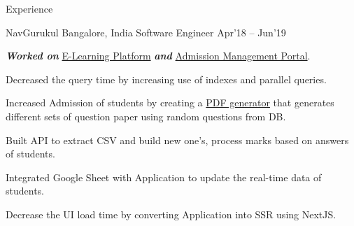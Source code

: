 \documentclass{resume} %
\begin{document}
\begin{rSection}{Experience}
  \begin{rWorkSection}{\Large NavGurukul}
                     {Bangalore, India}
                     {Software Engineer}
                     {Apr'18 -- Jun'19} {
    {\it\bf Worked on} \href{https://saral.navgurukul.org/}{E-Learning Platform} {\it\bf and} \href{http://admissions.navgurukul.org/}{Admission Management Portal}. 
    \item Decreased the query time by increasing use of indexes and parallel queries.
    \item Increased Admission of students by creating a \href{https://github.com/amarkrsinha1997/question-pdf-generator}{PDF generator} that generates different sets of question paper using random questions from DB.
    \item Built API to extract CSV and build new one's, process marks based on answers of students.
    \item Integrated Google Sheet with Application to update the real-time data of students.
    \item Decrease the UI load time by converting Application into SSR using NextJS.
  }
  \end{rWorkSection}

\end{rSection}

\end{document}
